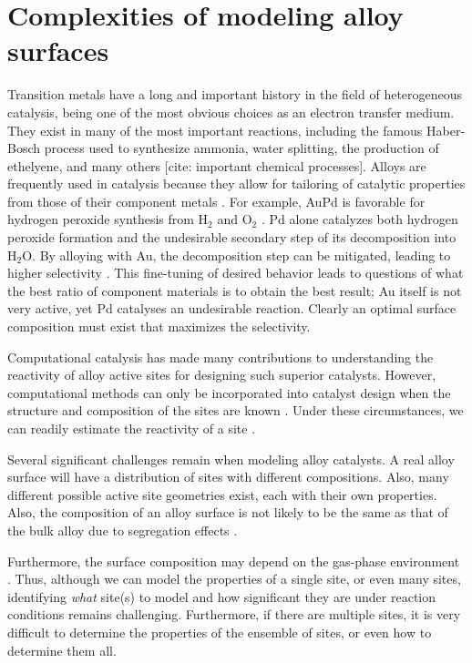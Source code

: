 \documentclass[12pt]{cmuthesis}
\begin{document}
\chapter{Complexities of modeling alloy surfaces}
\label{sec:ch1}
Transition metals have a long and important history in the field of heterogeneous catalysis, being one of the most obvious choices as an electron transfer medium. They exist in many of the most important reactions, including the famous Haber-Bosch process used to synthesize ammonia, water splitting, the production of ethelyene, and many others [cite: important chemical processes]. Alloys are frequently used in catalysis because they allow for tailoring of catalytic properties from those of their component metals \cite{ponec-2001-alloy-catal,yu-2012-review-pt}. For example, AuPd is favorable for hydrogen peroxide synthesis from H\(_{\text{2}}\) and O\(_{\text{2}}\) \cite{landon-2003-direc-synth}. Pd alone catalyzes both hydrogen peroxide formation and the undesirable secondary step of its decomposition into H\(_{\text{2}}\)O. By alloying with Au, the decomposition step can be mitigated, leading to higher selectivity \cite{edwards-2009-switc-off,plauck-2016-activ-sites}. This fine-tuning of desired behavior leads to questions of what the best ratio of component materials is to obtain the best result; Au itself is not very active, yet Pd catalyses an undesirable reaction. Clearly an optimal surface composition must exist that maximizes the selectivity.

Computational catalysis has made many contributions to understanding the reactivity of alloy active sites for designing such superior catalysts. However, computational methods can only be incorporated into catalyst design when the structure and composition of the sites are known \cite{kitchin-2008-densit-funct}. Under these circumstances, we can readily estimate the reactivity of a site \cite{greeley-2005,inoglu-2010-new-solid}.

Several significant challenges remain when modeling alloy catalysts. A real alloy surface will have a distribution of sites with different compositions. Also, many different possible active site geometries exist, each with their own properties. Also, the composition of an alloy surface is not likely to be the same as that of the bulk alloy due to segregation effects \cite{dowben-1990-surfac-segreg-phenom}.

Furthermore, the surface composition may depend on the gas-phase environment \cite{kitchin-2008-alloy}. Thus, although we can model the properties of a single site, or even many sites, identifying \emph{what} site(s) to model and how significant they are under reaction conditions remains challenging. Furthermore, if there are multiple sites, it is very difficult to determine the properties of the ensemble of sites, or even how to determine them all.
\end{document}
